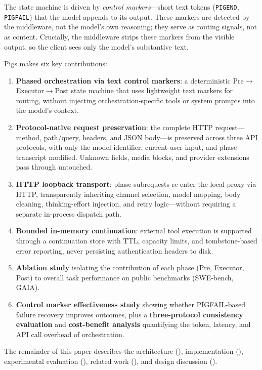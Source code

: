 The state machine is driven by \emph{control markers}---short text tokens (\texttt{PIGEND}, \texttt{PIGFAIL}) that the model appends to its output. These markers are detected by the middleware, not the model's own reasoning; they serve as routing signals, not as content. Crucially, the middleware strips these markers from the visible output, so the client sees only the model's substantive text.

Pigs makes six key contributions:

\begin{enumerate}
    \item \textbf{Phased orchestration via text control markers}: a deterministic Pre$\rightarrow$Executor$\rightarrow$Post state machine that uses lightweight text markers for routing, without injecting orchestration-specific tools or system prompts into the model's context.
    \item \textbf{Protocol-native request preservation}: the complete HTTP request---method, path/query, headers, and JSON body---is preserved across three API protocols, with only the model identifier, current user input, and phase transcript modified. Unknown fields, media blocks, and provider extensions pass through untouched.
    \item \textbf{HTTP loopback transport}: phase subrequests re-enter the local proxy via HTTP, transparently inheriting channel selection, model mapping, body cleaning, thinking-effort injection, and retry logic---without requiring a separate in-process dispatch path.
    \item \textbf{Bounded in-memory continuation}: external tool execution is supported through a continuation store with TTL, capacity limits, and tombstone-based error reporting, never persisting authentication headers to disk.
    \item \textbf{Ablation study} isolating the contribution of each phase (Pre, Executor, Post) to overall task performance on public benchmarks (SWE-bench, GAIA).
    \item \textbf{Control marker effectiveness study} showing whether PIGFAIL-based failure recovery improves outcomes, plus a \textbf{three-protocol consistency evaluation} and \textbf{cost-benefit analysis} quantifying the token, latency, and API call overhead of orchestration.
\end{enumerate}

The remainder of this paper describes the architecture (), implementation (), experimental evaluation (), related work (), and design discussion ().
